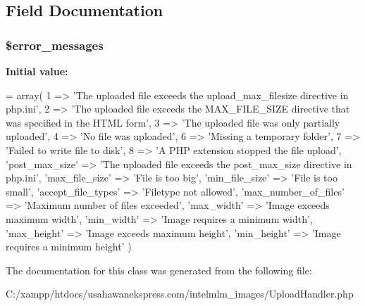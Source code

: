 \subsection{Field Documentation}
\hypertarget{class_upload_handler_adfe46d5b661b6423ddd3e008a900fe45}{
\subsubsection[{\$error\-\_\-messages}]{\setlength{\rightskip}{0pt plus 5cm}\$error\-\_\-messages\hspace{0.3cm}{\ttfamily [protected]}}}\label{class_upload_handler_adfe46d5b661b6423ddd3e008a900fe45}
{\bfseries Initial value\-:}
\begin{DoxyCode}
= array(
        1 => \textcolor{stringliteral}{'The uploaded file exceeds the upload\_max\_filesize directive in php.ini'},
        2 => \textcolor{stringliteral}{'The uploaded file exceeds the MAX\_FILE\_SIZE directive that was specified in the HTML form'},
        3 => \textcolor{stringliteral}{'The uploaded file was only partially uploaded'},
        4 => \textcolor{stringliteral}{'No file was uploaded'},
        6 => \textcolor{stringliteral}{'Missing a temporary folder'},
        7 => \textcolor{stringliteral}{'Failed to write file to disk'},
        8 => \textcolor{stringliteral}{'A PHP extension stopped the file upload'},
        \textcolor{stringliteral}{'post\_max\_size'} => \textcolor{stringliteral}{'The uploaded file exceeds the post\_max\_size directive in php.ini'},
        \textcolor{stringliteral}{'max\_file\_size'} => \textcolor{stringliteral}{'File is too big'},
        \textcolor{stringliteral}{'min\_file\_size'} => \textcolor{stringliteral}{'File is too small'},
        \textcolor{stringliteral}{'accept\_file\_types'} => \textcolor{stringliteral}{'Filetype not allowed'},
        \textcolor{stringliteral}{'max\_number\_of\_files'} => \textcolor{stringliteral}{'Maximum number of files exceeded'},
        \textcolor{stringliteral}{'max\_width'} => \textcolor{stringliteral}{'Image exceeds maximum width'},
        \textcolor{stringliteral}{'min\_width'} => \textcolor{stringliteral}{'Image requires a minimum width'},
        \textcolor{stringliteral}{'max\_height'} => \textcolor{stringliteral}{'Image exceeds maximum height'},
        \textcolor{stringliteral}{'min\_height'} => \textcolor{stringliteral}{'Image requires a minimum height'}
    )
\end{DoxyCode}


The documentation for this class was generated from the following file\-:\begin{DoxyCompactItemize}
\item 
C\-:/xampp/htdocs/usahawanekspress.\-com/intelmlm\-\_\-images/Upload\-Handler.\-php\end{DoxyCompactItemize}
